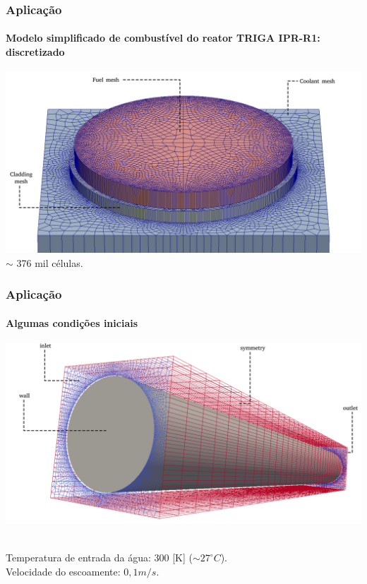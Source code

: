 \documentclass[svgnames,smaller,table]{beamer}
\begin{document}
\begin{frame}
  \frametitle{Aplicação}
  \framesubtitle{Modelo \textbf{simplificado} de combustível do reator TRIGA IPR-R1: discretizado}
  \centering\includegraphics[scale=0.32]{../figuras/regioes_edges_com_legenda_ingles.png}
  \centering
  \vspace{0.2cm}
  $\sim$ 376 mil células.
\end{frame}

\begin{frame}
  \frametitle{Aplicação}
  \framesubtitle{Algumas condições iniciais}
  \centering\includegraphics[scale=0.32]{../figuras/inlet_paredes_extremos_wireframe2.png}
  \vspace{0.2cm}
  \raggedright
  \\
  Temperatura de entrada da água: 300 [K] ($\sim27^{\circ}C$).
  \\
  Velocidade do escoamente: $0,1 m/s$.
\end{frame}
\end{document}
